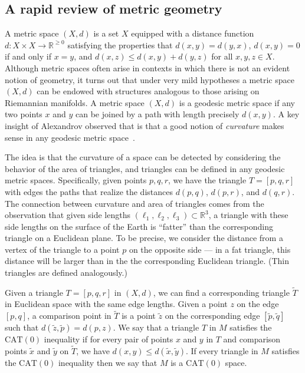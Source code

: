 \documentclass[a4paper,11pt]{article}
\newcommand{\CAT}{\textrm{CAT}}
\begin{document}
\subsection{A rapid review of metric geometry}

A metric space $(X,d)$ is a set $X$ equipped with a distance function $d \colon X \times X \to \mathbb{R}^{\geq 0}$ satisfying the properties that $d(x,y) = d(y,x)$, $d(x,y) = 0$ if and only if $x = y$, and $d(x,z) \leq d(x,y) + d(y,z)$ for all $x,y,z \in X$.
Although metric spaces often arise in contexts in which there is not an evident notion of geometry, it turns out that under very mild hypotheses a metric space $(X,d)$ can be endowed with structures analogous to those arising on Riemannian manifolds.
A metric space $(X,d)$ is a geodesic metric space if any two points $x$ and $y$ can be joined by a path with length precisely $d(x,y)$.
A key insight of Alexandrov observed that is that a good notion of {\em curvature} makes sense in any geodesic metric space~\cite{alexandrov1957uber}.

The idea is that the curvature of a space can be detected by considering the behavior of the area of triangles, and triangles can be defined in any geodesic metric spaces.
Specifically, given points $p, q, r$, we have the triangle $T = [p,q,r]$ with edges the paths that realize the distances $d(p,q)$, $d(p,r)$, and $d(q,r)$.
The connection between curvature and area of triangles comes from the observation that given side lengths $(\ell_1, \ell_2, \ell_3) \subset \mathbb{R}^3$, a triangle with these side lengths on the surface of the Earth is ``fatter'' than the corresponding triangle on a Euclidean plane.
To be precise, we consider the distance from a vertex of the triangle to a point $p$ on the opposite side --- in a fat triangle, this distance will be larger than in the the corresponding Euclidean triangle. (Thin triangles are defined analogously.)

Given a triangle $T=[p,q,r]$ in $(X,d)$, we can find a corresponding triangle $\tilde{T}$ in Euclidean space with the same edge lengths.
Given a point $z$ on the edge $[p,q]$, a comparison point in $\tilde{T}$ is a point $\tilde{z}$ on the corresponding edge $[\tilde{p}, \tilde{q}]$ such that $d(\tilde{z}, \tilde{p}) = d(p,z)$.
We say that a triangle $T$ in $M$ satisfies the $\CAT(0)$ inequality if for every pair of points $x$ and $y$ in $T$ and comparison points $\tilde{x}$ and $\tilde{y}$ on $\tilde{T}$, we have $d(x,y) \leq d(\tilde{x}, \tilde{y})$.
If every triangle in $M$ satisfies the $\CAT(0)$ inequality then we say that $M$ is a $\CAT(0)$ space.
\end{document}

